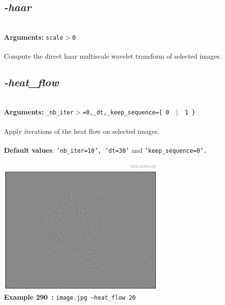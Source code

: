\documentclass[a4paper,11pt,twoside]{book}
\begin{document}
\subsection{\emph{-haar} }\vspace*{-0.5em}
~\\\textbf{Arguments: } 
{\small \texttt{scale$>$0}}\\~\\
Compute the direct haar multiscale wavelet transform of selected images.


\subsection{\emph{-heat\_flow} }\vspace*{-0.5em}
~\\\textbf{Arguments: } 
{\small \texttt{\_nb\_iter$>$=0,\_dt,\_keep\_sequence=\{ 0 ~$|$~ 1 \}}}\\~\\
Apply iterations of the heat flow on selected images.
~\\~\\\textbf{Default values}: {\small \texttt{'nb\_iter=10', 'dt=30'} and \texttt{'keep\_sequence=0'.}}
\begin{center}\includegraphics[keepaspectratio=true,height=7cm,width=\textwidth]{img/gmic_def290.jpg}\\
{\footnotesize \textbf{Example 290~:} \texttt{image.jpg --heat\_flow 20}}
\end{center}
\end{document}
